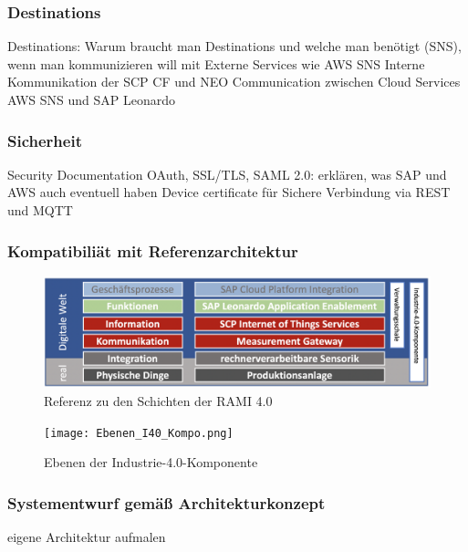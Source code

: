 \subsubsection{Destinations}
Destinations: Warum braucht man Destinations und welche man benötigt (SNS),  wenn man kommunizieren will mit
Externe Services wie AWS SNS
Interne Kommunikation der SCP CF und NEO
Communication zwischen Cloud Services AWS SNS und SAP Leonardo

\subsubsection{Sicherheit}
Security Documentation
OAuth, SSL/TLS, SAML 2.0: erklären, was SAP und AWS auch eventuell haben
Device certificate für Sichere Verbindung via REST und MQTT
\subsubsection{Kompatibiliät mit Referenzarchitektur}

\begin{figure}[H]
  \centering
  \includegraphics[width=1.0\linewidth]{pictures/rami_custom1}
  \caption[Referenz zu den Schichten der RAMI 4.0]{Referenz zu den Schichten der RAMI 4.0}
  \label{ramicustom}
\end{figure}

\begin{figure}[h]
  \centering
  \texttt{[image: Ebenen\_I40\_Kompo.png]}
  \caption[Ebenen der Industrie-4.0-Komponente]{Ebenen der Industrie-4.0-Komponente \citep[S. 52]{BITKOM2015}}
  \label{ebenen_i40}
\end{figure}

\subsubsection{Systementwurf gemäß Architekturkonzept}

eigene Architektur aufmalen

